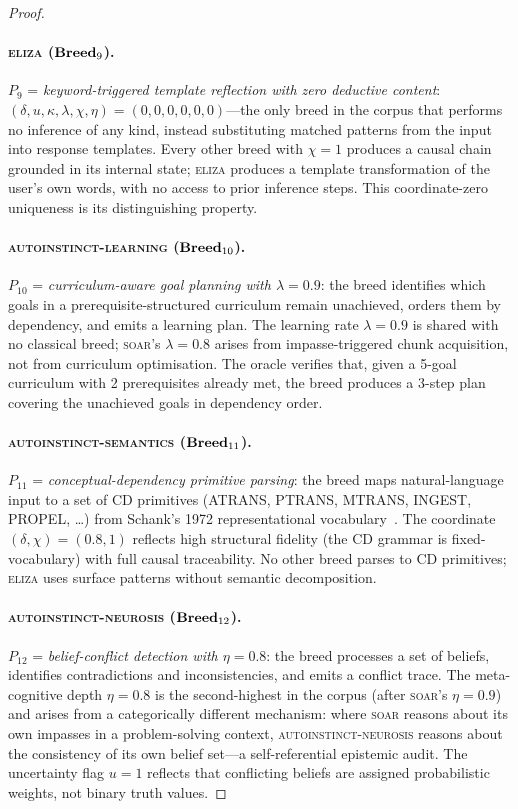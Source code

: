 \begin{proof}
\paragraph{\textsc{eliza} ($\mathbf{Breed}_9$).}
$P_9$ = \emph{keyword-triggered template reflection with zero deductive content}:
$(\delta, u, \kappa, \lambda, \chi, \eta) = (0, 0, 0, 0, 0, 0)$---the only breed in the
corpus that performs no inference of any kind, instead substituting matched patterns from
the input into response templates. Every other breed with $\chi = 1$ produces a causal
chain grounded in its internal state; \textsc{eliza} produces a template transformation
of the user's own words, with no access to prior inference steps. This coordinate-zero
uniqueness is its distinguishing property.

\paragraph{\textsc{autoinstinct-learning} ($\mathbf{Breed}_{10}$).}
$P_{10}$ = \emph{curriculum-aware goal planning with $\lambda = 0.9$}: the breed
identifies which goals in a prerequisite-structured curriculum remain unachieved,
orders them by dependency, and emits a learning plan. The learning rate $\lambda = 0.9$
is shared with no classical breed; \textsc{soar}'s $\lambda = 0.8$ arises from
impasse-triggered chunk acquisition, not from curriculum optimisation. The oracle verifies
that, given a 5-goal curriculum with 2 prerequisites already met, the breed produces a
3-step plan covering the unachieved goals in dependency order.

\paragraph{\textsc{autoinstinct-semantics} ($\mathbf{Breed}_{11}$).}
$P_{11}$ = \emph{conceptual-dependency primitive parsing}: the breed maps natural-language
input to a set of CD primitives (ATRANS, PTRANS, MTRANS, INGEST, PROPEL, \ldots) from
Schank's 1972 representational vocabulary~\cite{schank1972}. The coordinate
$(\delta, \chi) = (0.8, 1)$ reflects high structural fidelity (the CD grammar is
fixed-vocabulary) with full causal traceability. No other breed parses to CD primitives;
\textsc{eliza} uses surface patterns without semantic decomposition.

\paragraph{\textsc{autoinstinct-neurosis} ($\mathbf{Breed}_{12}$).}
$P_{12}$ = \emph{belief-conflict detection with $\eta = 0.8$}: the breed processes a
set of beliefs, identifies contradictions and inconsistencies, and emits a conflict trace.
The meta-cognitive depth $\eta = 0.8$ is the second-highest in the corpus (after
\textsc{soar}'s $\eta = 0.9$) and arises from a categorically different mechanism: where
\textsc{soar} reasons about its own impasses in a problem-solving context,
\textsc{autoinstinct-neurosis} reasons about the consistency of its own belief set---a
self-referential epistemic audit. The uncertainty flag $u = 1$ reflects that conflicting
beliefs are assigned probabilistic weights, not binary truth values.


\end{proof}

